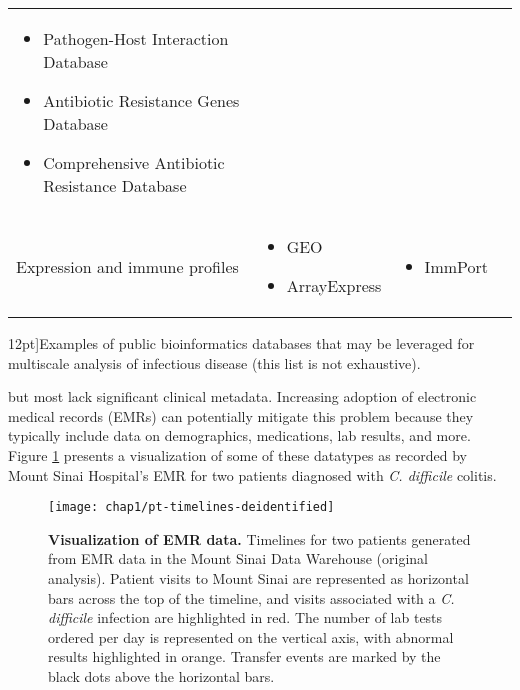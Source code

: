 \begin{table*}[ht]
\begin{tabular}{p{3.5cm} l l l}
\begin{minipage}[t]{3.5cm}
      \raggedright
      \begin{itemize}[noitemsep]
      \item Pathogen-Host Interaction Database 
      \item Antibiotic Resistance Genes Database
      \item Comprehensive Antibiotic Resistance Database
      \end{itemize}
      \smallskip
    \end{minipage} &
    \\
    Expression and immune profiles &
    \begin{minipage}[t]{3.5cm}
      \raggedright
      \begin{itemize}[noitemsep]
      \item GEO
      \item ArrayExpress
      \end{itemize}
    \end{minipage} &
    \begin{minipage}[t]{3.5cm}
      \raggedright
      \begin{itemize}[noitemsep]
      \item ImmPort
      \end{itemize}
    \end{minipage} &
    \\
    \bottomrule
  \end{tabular}
  \caption[Bioinformatics databases for infectious diseases][12pt]{Examples of public bioinformatics databases that may be leveraged for multiscale analysis of infectious disease (this list is not exhaustive).}
  \label{tab:id_bioinf_dbs}
\end{table*}
but most lack significant clinical metadata. Increasing adoption of electronic medical records (EMRs) can potentially mitigate this problem because they typically include data on demographics, medications, lab results, and more. Figure \ref{fig:emr_sample_viz} presents a visualization of some of these datatypes as recorded by Mount Sinai Hospital’s EMR for two patients diagnosed with \textit{C. difficile} colitis.
\begin{figure}[htb]
  \texttt{[image: chap1/pt-timelines-deidentified]}               
  \caption[Visualization of EMR data]{\textbf{Visualization of EMR data.} Timelines for two patients generated from EMR data in the Mount Sinai Data Warehouse (original analysis). Patient visits to Mount Sinai are represented as horizontal bars across the top of the timeline, and visits associated with a \textit{C. difficile} infection are highlighted in red.  The number of lab tests ordered per day is represented on the vertical axis, with abnormal results highlighted in orange.  Transfer events are marked by the black dots above the horizontal bars.}
  \label{fig:emr_sample_viz}
\end{figure}
